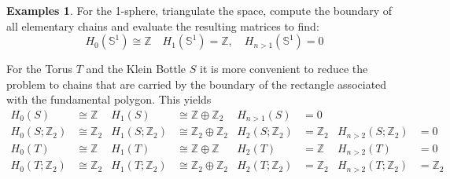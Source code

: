 \documentclass[a4paper,DIV12,10pt]{scrartcl}
\newcommand{\Z}{\ensuremath{\mathbb{Z}}}   %
\theoremstyle{definition}
\newtheorem{examples}[satz]{Examples}
\begin{document}
\begin{examples}
	For the 1-sphere, triangulate the space, compute the boundary of all elementary chains and evaluate the resulting matrices to find:
	\[H_0(\mathbb{S}^1)\cong\Z\quad H_1(\mathbb{S}^1)=\Z, \quad H_{n>1}(\mathbb{S}^1)=0\]
	
	For the Torus $T$ and the Klein Bottle $S$ it is more convenient to reduce the problem to chains that are carried by the boundary of the rectangle associated with the fundamental polygon. This yields
	\begin{align*}
	H_0(S)&\cong\Z&H_1(S)&\cong\Z\oplus\Z_2&H_{n>1}(S)&=0\\
	H_0(S;\Z_2)&\cong\Z_2&H_1(S;\Z_2)&\cong\Z_2\oplus\Z_2&H_{2}(S;\Z_2)&=\Z_2&H_{n>2}(S;\Z_2)&=0\\
	H_0(T)&\cong\Z&H_1(T)&\cong\Z\oplus\Z&H_{2}(T)&=\Z&H_{n>2}(T)&=0\\
	H_0(T;\Z_2)&\cong\Z_2&H_1(T;\Z_2)&\cong\Z_2\oplus\Z_2&H_{2}(T;\Z_2)&=\Z_2&H_{n>2}(T;\Z_2)&=\Z_2\\
 	\end{align*}
\end{examples}
\setcounter{section}{3}
\end{document}
